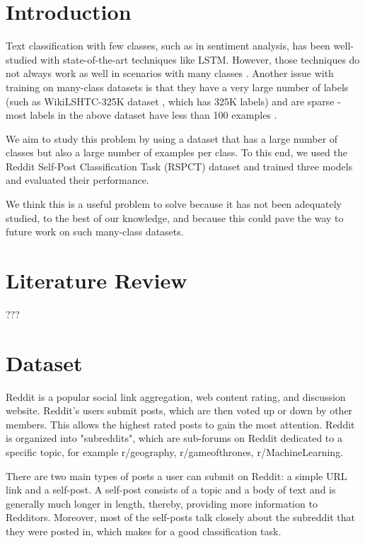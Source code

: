 \documentclass{sig-alternate-05-2015}
\begin{document}
%
%
\printccsdesc



\section{Introduction}

Text classification with few classes, such as in sentiment analysis, has been well-studied \cite{sentiment-analysis} with state-of-the-art techniques like LSTM. However, those techniques do not always work as well in scenarios with many classes \cite{many-classes}. Another issue with training on many-class datasets is that they have a very large number of labels (such as WikiLSHTC-325K dataset \cite{partalas2015lshtc}, which has 325K labels) and are sparse - most labels in the above dataset have less than 100 examples \cite{jonesreddit}.

We aim to study this problem by using a dataset that has a large number of classes but also a large number of examples per class. To this end, we used the Reddit Self-Post Classification Task (RSPCT) dataset and trained three models and evaluated their performance.

We think this is a useful problem to solve because it has not been adequately studied, to the best of our knowledge, and because this could pave the way to future work on such many-class datasets. 

\section{Literature Review}

???

\section{Dataset}

Reddit is a popular social link aggregation, web content rating, and discussion website. Reddit's users submit posts, which are then voted up or down by other members. This allows the highest rated posts to gain the most attention. Reddit is organized into "subreddits", which are sub-forums on Reddit dedicated to a specific topic, for example r/geography, r/gameofthrones, r/MachineLearning.

There are two main types of posts a user can submit on Reddit: a simple URL link and a self-post. A self-post consists of a topic and a body of text and is generally much longer in length, thereby, providing more information to Redditors. Moreover, most of the self-posts talk closely about the subreddit that they were posted in, which makes for a good classification task. 
\end{document}
